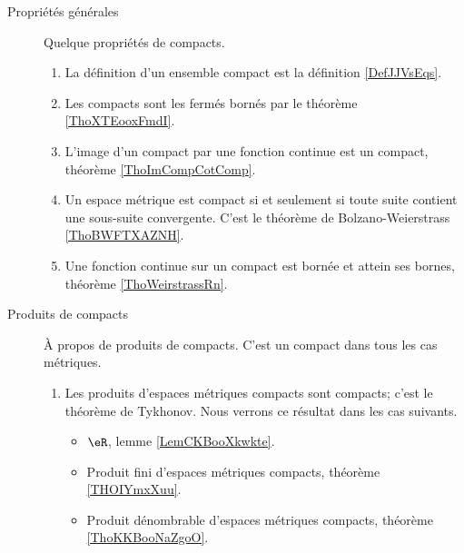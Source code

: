 
        \label{THEMEooQQBHooLcqoKB}
    \begin{description}

        \item[Propriétés générales]

            Quelque propriétés de compacts.

                \begin{enumerate}
    \item
        La définition d'un ensemble compact est la définition \ref{DefJJVsEqs}.
    \item
        Les compacts sont les fermés bornés par le théorème \ref{ThoXTEooxFmdI}.
    \item
        L'image d'un compact par une fonction continue est un compact, théorème \ref{ThoImCompCotComp}.
    \item 
        Un espace métrique est compact si et seulement si toute suite contient une sous-suite convergente. C'est le théorème de Bolzano-Weierstrass \ref{ThoBWFTXAZNH}.
    \item
        Une fonction continue sur un compact est bornée et attein ses bornes, théorème \ref{ThoWeirstrassRn}.
                \end{enumerate}

        \item[Produits de compacts] 
            À propos de produits de compacts. C'est un compact dans tous les cas métriques.
    \begin{enumerate}
    \item
        Les produits d'espaces métriques compacts sont compacts; c'est le théorème de Tykhonov. Nous verrons ce résultat dans les cas suivants.
        \begin{itemize}
    \item
         \( \eR\), lemme \ref{LemCKBooXkwkte}.
    \item
        Produit fini d'espaces métriques compacts, théorème \ref{THOIYmxXuu}.
    \item
        Produit dénombrable d'espaces métriques compacts, théorème \ref{ThoKKBooNaZgoO}.
        \end{itemize}
    \end{enumerate}
    \end{description}
